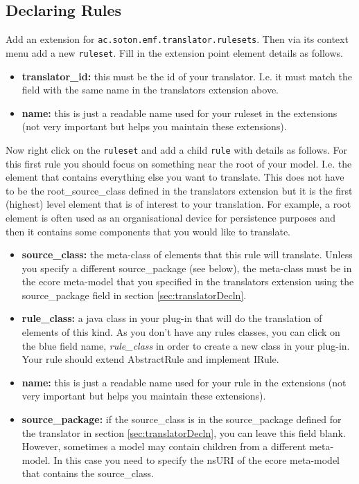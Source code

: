 \subsection{Declaring Rules}
\label{sec:rulesDecln}

	Add an extension for \texttt{ac.soton.emf.translator.rulesets}. Then via its context menu add a new \texttt{ruleset}. Fill in the extension point element details as follows.
	\begin{itemize}
		\item \textbf{translator\_id:} this must be the id of your translator. I.e. it must match the field with the same name in the translators extension above.
		\item \textbf{name:} this is just a readable name used for your ruleset in the extensions (not very important but helps you maintain these extensions).
	\end{itemize}
	Now right click on the \texttt{ruleset} and add a child \texttt{rule} with details as follows. For this first rule you should focus on something near the root of your model. I.e. the element that contains everything else you want to translate. This does not have to be the root\_source\_class defined in the translators extension but it is the first (highest) level element that is of interest to your translation. For example, a root element is often used as an organisational device for persistence purposes and then it contains some components that you would like to translate.
	\begin{itemize}
		\item \textbf{source\_class:} the meta-class of elements that this rule will translate. Unless you specify a different source\_package (see below), the meta-class must be in the ecore meta-model that you specified in the translators extension using the source\_package field in section \ref{sec:translatorDecln}.
		\item \textbf{rule\_class:} a java class in your plug-in that will do the translation of elements of this kind. As you don't have any rules classes, you can click on the blue field name, \emph{rule\_class} in order to create a new class in your plug-in. Your rule should extend AbstractRule and implement IRule.
		\item \textbf{name:} this is just a readable name used for your rule in the extensions (not very important but helps you maintain these extensions).
		\item \textbf{source\_package:} if the source\_class is in the source\_package defined for the translator in section \ref{sec:translatorDecln}, you can leave this field blank. However, sometimes a model may contain children from a different meta-model. In this case you need to specify the nsURI of the ecore meta-model that contains the source\_class.
	\end{itemize}
